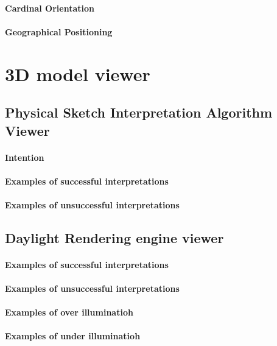 		\paragraph{Cardinal Orientation}
		\paragraph{Geographical Positioning}

	\section{3D model viewer}
		\subsection{Physical Sketch Interpretation Algorithm Viewer}
			\paragraph{Intention}
			\paragraph{Examples of successful interpretations}
			\paragraph{Examples of unsuccessful interpretations}

		\subsection{Daylight Rendering engine viewer}
			\paragraph{Examples of successful interpretations}
			\paragraph{Examples of unsuccessful interpretations}
				\paragraph{Examples of over illuminatioh}
				\paragraph{Examples of under illuminatioh}

